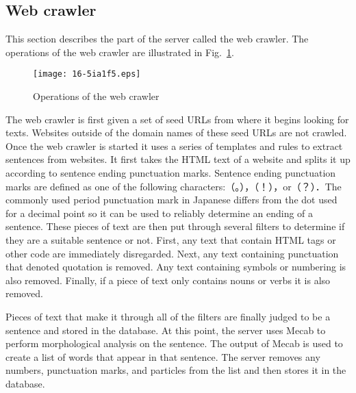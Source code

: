 \documentclass[english]{jnlp_1.4}
\begin{document}
\subsection{Web crawler}

This section describes the part of the server called the web crawler. The operations of the web crawler are illustrated in Fig.~\ref{fig5}.

\begin{figure}[b]
\begin{center}
  \texttt{[image: 16-5ia1f5.eps]}
\end{center}
  \caption{Operations of the web crawler}
  \label{fig5}
\end{figure}

The web crawler is first given a set of seed URLs from where it begins looking for texts. Websites outside of the domain names of these seed URLs are not crawled. Once the web crawler is started it uses a series of templates and rules to extract sentences from websites. It first takes the HTML text of a website and splits it up according to sentence ending punctuation marks. Sentence ending punctuation marks are defined as one of the following characters:（。），（！），or（？）．The commonly used period punctuation mark in Japanese differs from the dot used for a decimal point so it can be used to reliably determine an ending of a sentence. These pieces of text are then put through several filters to determine if they are a suitable sentence or not. First, any text that contain HTML tags or other code are immediately disregarded. Next, any text containing punctuation that denoted quotation is removed. Any text containing symbols or numbering is also removed. Finally, if a piece of text only contains nouns or verbs it is also removed.

Pieces of text that make it through all of the filters are finally judged to be a sentence and stored in the database. At this point, the server uses Mecab to perform morphological analysis on the sentence. The output of Mecab is used to create a list of words that appear in that sentence. The server removes any numbers, punctuation marks, and particles from the list and then stores it in the database.
\end{document}
